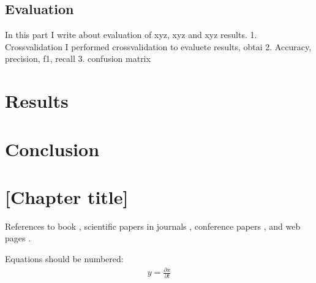 \documentclass[a4paper,twoside,12pt]{book}
\begin{document}
\section{Evaluation}
In this part I write about evaluation of  xyz, xyz and xyz results.
1. Crossvalidation
I performed crossvalidation to evaluete results, obtai
2. Accuracy, precision, f1, recall
3. confusion matrix

\chapter{Results}

\chapter{Conclusion}

\chapter{[Chapter title]}



References to 
book \cite{bib:book},
\cite{bib:1}
scientific papers in journals \cite{bib:article},
conference papers \cite{bib:conference}, and web pages \cite{bib:internet}.

Equations should be numbered:
\begin{align}
y = \frac{\partial x}{\partial t}
\end{align}

%
\end{document}
